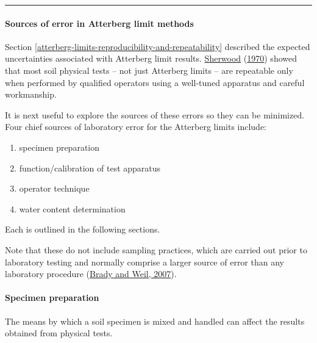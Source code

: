 \documentclass[
  letterpaper,
  openany]{book}
\providecommand{\tightlist}{%
  \setlength{\itemsep}{0pt}\setlength{\parskip}{0pt}}
\begin{document}
\begin{center}\rule{0.5\linewidth}{0.5pt}\end{center}

\hypertarget{atterberg-limits-error-sources}{%
\paragraph{Sources of error in Atterberg limit methods}\label{atterberg-limits-error-sources}}

Section \ref{atterberg-limits-reproducibility-and-repeatability} described the expected uncertainties associated with Atterberg limit results.
\protect\hyperlink{ref-Sherwood1970}{Sherwood} (\protect\hyperlink{ref-Sherwood1970}{1970}) showed that most soil physical tests -- not just Atterberg limits -- are repeatable only when performed by qualified operators using a well-tuned apparatus and careful workmanship.

It is next useful to explore the sources of these errors so they can be minimized. Four chief sources of laboratory error for the Atterberg limits include:

\begin{enumerate}
\def\labelenumi{\arabic{enumi}.}
\tightlist
\item
  specimen preparation
\item
  function/calibration of test apparatus
\item
  operator technique
\item
  water content determination
\end{enumerate}

Each is outlined in the following sections.

Note that these do not include sampling practices, which are carried out prior to laboratory testing and normally comprise a larger source of error than any laboratory procedure (\protect\hyperlink{ref-Brady2007}{Brady and Weil, 2007}).

\hypertarget{specimen-preparation}{%
\paragraph{Specimen preparation}\label{specimen-preparation}}

The means by which a soil specimen is mixed and handled can affect the results obtained from physical tests.
\end{document}

